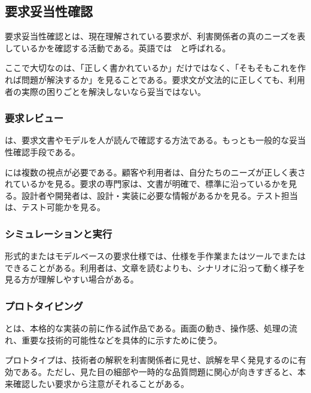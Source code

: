 \subsection{要求妥当性確認}

要求妥当性確認とは、現在理解されている要求が、利害関係者の真のニーズを表しているかを確認する活動である。英語では \,\, と呼ばれる。

ここで大切なのは、「正しく書かれているか」だけではなく、「そもそもこれを作れば問題が解決するか」を見ることである。要求文が文法的に正しくても、利用者の実際の困りごとを解決しないなら妥当ではない。


\subsubsection{要求レビュー}

は、要求文書やモデルを人が読んで確認する方法である。もっとも一般的な妥当性確認手段である。

には複数の視点が必要である。顧客や利用者は、自分たちのニーズが正しく表されているかを見る。要求の専門家は、文書が明確で、標準に沿っているかを見る。設計者や開発者は、設計・実装に必要な情報があるかを見る。テスト担当は、テスト可能かを見る。

\subsubsection{シミュレーションと実行}

形式的またはモデルベースの要求仕様では、仕様を手作業またはツールでまたはできることがある。利用者は、文章を読むよりも、シナリオに沿って動く様子を見る方が理解しやすい場合がある。

\subsubsection{プロトタイピング}

とは、本格的な実装の前に作る試作品である。画面の動き、操作感、処理の流れ、重要な技術的可能性などを具体的に示すために使う。

プロトタイプは、技術者の解釈を利害関係者に見せ、誤解を早く発見するのに有効である。ただし、見た目の細部や一時的な品質問題に関心が向きすぎると、本来確認したい要求から注意がそれることがある。

